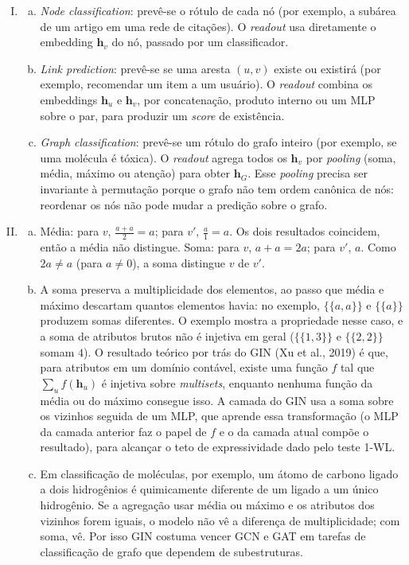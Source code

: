 \documentclass{dlproblemset}
\begin{document}
\begin{enumerate}[I)]
    \item
    \begin{enumerate}[(a)]
        \item \textit{Node classification}: prevê-se o rótulo de cada nó (por exemplo, a subárea de um artigo em uma rede de citações). O \textit{readout} usa diretamente o embedding $\mathbf{h}_v$ do nó, passado por um classificador.
        \item \textit{Link prediction}: prevê-se se uma aresta $(u,v)$ existe ou existirá (por exemplo, recomendar um item a um usuário). O \textit{readout} combina os embeddings $\mathbf{h}_u$ e $\mathbf{h}_v$, por concatenação, produto interno ou um MLP sobre o par, para produzir um \textit{score} de existência.
        \item \textit{Graph classification}: prevê-se um rótulo do grafo inteiro (por exemplo, se uma molécula é tóxica). O \textit{readout} agrega todos os $\mathbf{h}_v$ por \textit{pooling} (soma, média, máximo ou atenção) para obter $\mathbf{h}_G$. Esse \textit{pooling} precisa ser invariante à permutação porque o grafo não tem ordem canônica de nós: reordenar os nós não pode mudar a predição sobre o grafo.
    \end{enumerate}

    \item
    \begin{enumerate}[(a)]
        \item Média: para $v$, $\tfrac{a+a}{2} = a$; para $v'$, $\tfrac{a}{1} = a$. Os dois resultados coincidem, então a média não distingue. Soma: para $v$, $a + a = 2a$; para $v'$, $a$. Como $2a \neq a$ (para $a \neq 0$), a soma distingue $v$ de $v'$.
        \item A soma preserva a multiplicidade dos elementos, ao passo que média e máximo descartam quantos elementos havia: no exemplo, $\{\!\!\{a,a\}\!\!\}$ e $\{\!\!\{a\}\!\!\}$ produzem somas diferentes. O exemplo mostra a propriedade nesse caso, e a soma de atributos brutos não é injetiva em geral ($\{\!\!\{1,3\}\!\!\}$ e $\{\!\!\{2,2\}\!\!\}$ somam $4$). O resultado teórico por trás do GIN (Xu et al., 2019) é que, para atributos em um domínio contável, existe uma função $f$ tal que $\sum_{u} f(\mathbf{h}_u)$ é injetiva sobre \textit{multisets}, enquanto nenhuma função da média ou do máximo consegue isso. A camada do GIN usa a soma sobre os vizinhos seguida de um MLP, que aprende essa transformação (o MLP da camada anterior faz o papel de $f$ e o da camada atual compõe o resultado), para alcançar o teto de expressividade dado pelo teste 1-WL.
        \item Em classificação de moléculas, por exemplo, um átomo de carbono ligado a dois hidrogênios é quimicamente diferente de um ligado a um único hidrogênio. Se a agregação usar média ou máximo e os atributos dos vizinhos forem iguais, o modelo não vê a diferença de multiplicidade; com soma, vê. Por isso GIN costuma vencer GCN e GAT em tarefas de classificação de grafo que dependem de subestruturas.
    \end{enumerate}


\end{enumerate}
\end{document}
